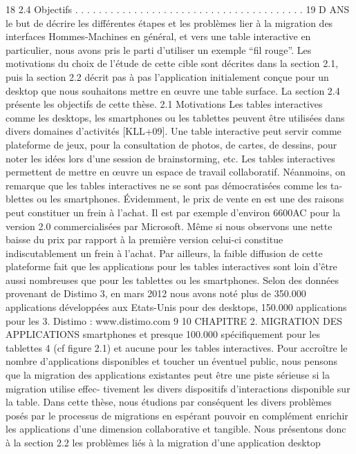 \documentclass{article}
\begin{document}
18
2.4
Objectifs . . . . . . . . . . . . . . . . . . . . . . . . . . . . . . . . . . . . . . .
19
D
ANS le but de décrire les différentes étapes et les problèmes lier à la migration des interfaces
Hommes-Machines en général, et vers une table interactive en particulier, nous avons pris le
parti d’utiliser un exemple “ﬁl rouge”. Les motivations du choix de l’étude de cette cible sont décrites
dans la section 2.1, puis la section 2.2 décrit pas à pas l’application initialement conçue pour un
desktop que nous souhaitons mettre en œuvre une table surface. La section 2.4 présente les objectifs
de cette thèse.
2.1
Motivations
Les tables interactives comme les desktops, les smartphones ou les tablettes peuvent être utilisées
dans divers domaines d’activités [KLL+09]. Une table interactive peut servir comme plateforme de
jeux, pour la consultation de photos, de cartes, de dessins, pour noter les idées lors d’une session
de brainstorming, etc. Les tables interactives permettent de mettre en œuvre un espace de travail
collaboratif.
Néanmoins, on remarque que les tables interactives ne se sont pas démocratisées comme les ta-
blettes ou les smartphones. Évidemment, le prix de vente en est une des raisons peut constituer un
frein à l’achat. Il est par exemple d’environ 6600AC pour la version 2.0 commercialisées par Microsoft.
Même si nous observons une nette baisse du prix par rapport à la première version celui-ci constitue
indiscutablement un frein à l’achat. Par ailleurs, la faible diffusion de cette plateforme fait que les
applications pour les tables interactives sont loin d’être aussi nombreuses que pour les tablettes ou
les smartphones. Selon des données provenant de Distimo 3, en mars 2012 nous avons noté plus de
350.000 applications développées aux Etats-Unis pour des desktops, 150.000 applications pour les
3. Distimo : www.distimo.com
9
10
CHAPITRE 2. MIGRATION DES APPLICATIONS
smartphones et presque 100.000 spéciﬁquement pour les tablettes 4 (cf ﬁgure 2.1) et aucune pour les
tables interactives.
Pour accroître le nombre d’applications disponibles et toucher un éventuel public, nous pensons
que la migration des applications existantes peut être une piste sérieuse si la migration utilise effec-
tivement les divers dispositifs d’interactions disponible sur la table. Dans cette thèse, nous étudions
par conséquent les divers problèmes posés par le processus de migrations en espérant pouvoir en
complément enrichir les applications d’une dimension collaborative et tangible.
Nous présentons donc à la section 2.2 les problèmes liés à la migration d’une application desktop
\end{document}
